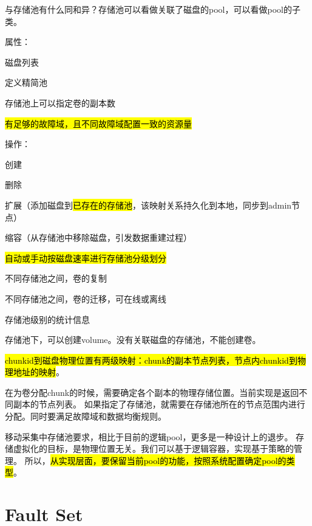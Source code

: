 与存储池有什么同和异？存储池可以看做关联了磁盘的pool，可以看做pool的子类。

属性：
\begin{enumbox}
    \item 磁盘列表
    \item 定义精简池
    \item 存储池上可以指定卷的副本数
    \item \hl{有足够的故障域，且不同故障域配置一致的资源量}
\end{enumbox}

操作：
\begin{enumbox}
    \item 创建
    \item 删除
    \item 扩展（添加磁盘到\hl{已存在的存储池}，该映射关系持久化到本地，同步到admin节点）
    \item 缩容（从存储池中移除磁盘，引发数据重建过程）
    \item \hl{自动或手动按磁盘速率进行存储池分级划分}
    \item 不同存储池之间，卷的复制
    \item 不同存储池之间，卷的迁移，可在线或离线
    \item 存储池级别的统计信息
\end{enumbox}


存储池下，可以创建volume。没有关联磁盘的存储池，不能创建卷。

\hl{chunkid到磁盘物理位置有两级映射：chunk的副本节点列表，节点内chunkid到物理地址的映射}。

在为卷分配chunk的时候，需要确定各个副本的物理存储位置。当前实现是返回不同副本的节点列表。
如果指定了存储池，就需要在存储池所在的节点范围内进行分配。同时要满足故障域和数据均衡规则。

\begin{tcolorbox}
移动采集中存储池要求，相比于目前的逻辑pool，更多是一种设计上的退步。
存储虚拟化的目标，是物理位置无关。我们可以基于逻辑容器，实现基于策略的管理。
所以，\hl{从实现层面，要保留当前pool的功能，按照系统配置确定pool的类型}。
\end{tcolorbox}


\section{Fault Set}

